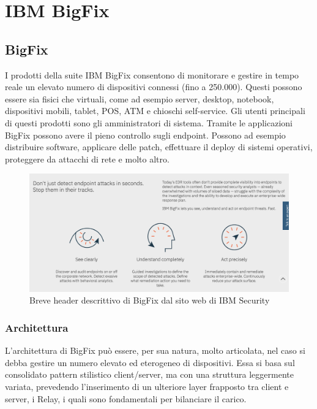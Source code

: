 \chapter{IBM BigFix}

\section{BigFix}
I prodotti della suite IBM BigFix consentono di monitorare e gestire in tempo reale un elevato numero di dispositivi connessi (fino a 250.000). Questi possono essere sia fisici che virtuali, come ad esempio server, desktop, notebook, dispositivi mobili, tablet, POS, ATM e chioschi self-service. Gli utenti principali di questi prodotti sono gli amministratori di sistema. Tramite le applicazioni BigFix possono avere il pieno controllo sugli endpoint. Possono ad esempio distribuire software, applicare delle patch, effettuare il deploy di sistemi operativi, proteggere da attacchi di rete e molto altro.
\begin{figure}[h!]
	\centering
	\includegraphics[width=\textwidth,keepaspectratio=true]{capitoli/imgs/BigFixManifest.png}
	\caption{Breve header descrittivo di BigFix dal sito web di IBM Security}
\end{figure}
\subsection{Architettura}
L'architettura di BigFix può essere, per sua natura, molto articolata, nel caso si debba gestire un numero elevato ed eterogeneo di dispositivi. Essa si basa sul consolidato pattern stilistico client/server, ma con una struttura leggermente variata, prevedendo l'inserimento di un ulteriore layer frapposto tra client e server, i Relay, i quali sono fondamentali per bilanciare il carico.
